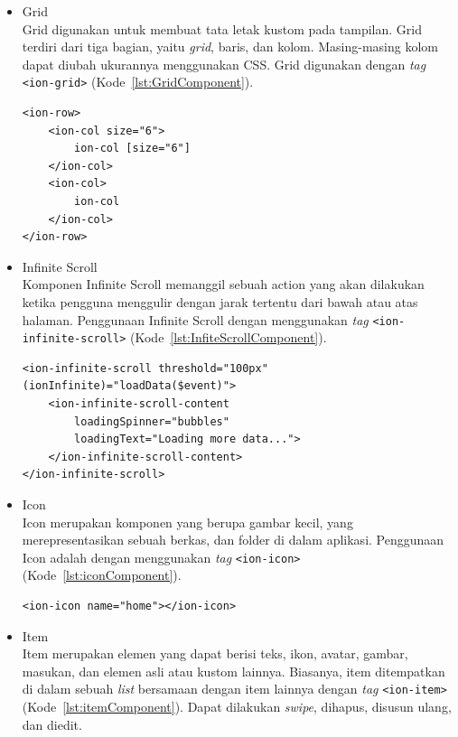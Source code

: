 \begin{itemize}
	\item Grid \\
	Grid digunakan untuk membuat tata letak kustom pada tampilan. Grid terdiri dari tiga bagian, yaitu \textit{grid}, baris, dan kolom. Masing-masing kolom dapat diubah ukurannya menggunakan CSS. Grid digunakan dengan \textit{tag} \texttt{<ion-grid>} (Kode~\ref{lst:GridComponent}).	

\begin{lstlisting}[label={lst:GridComponent}, caption=Potongan Kode Program dari Grid Component]
<ion-row>
	<ion-col size="6">
    	ion-col [size="6"]
    </ion-col>
    <ion-col>
      	ion-col
    </ion-col>
</ion-row>
\end{lstlisting}
	\newpage
	\item Infinite Scroll	\\
	Komponen Infinite Scroll memanggil sebuah action yang akan dilakukan ketika pengguna menggulir dengan jarak tertentu dari bawah atau atas halaman. Penggunaan Infinite Scroll dengan menggunakan {\it tag} \texttt{<ion-infinite-scroll>} (Kode~\ref{lst:InfiteScrollComponent}). 
	
\begin{lstlisting}[label={lst:InfiteScrollComponent}, caption=Potongan Kode Program dari Infinite Scroll Component]
<ion-infinite-scroll threshold="100px" (ionInfinite)="loadData($event)">
	<ion-infinite-scroll-content
		loadingSpinner="bubbles"
		loadingText="Loading more data...">
	</ion-infinite-scroll-content>
</ion-infinite-scroll>
\end{lstlisting}
	
	\item Icon \\
	Icon merupakan komponen yang berupa gambar kecil, yang merepresentasikan sebuah berkas, dan folder di dalam aplikasi. Penggunaan Icon adalah dengan menggunakan {\it tag} \texttt{<ion-icon>} (Kode~\ref{lst:iconComponent}).
\begin{lstlisting}[label={lst:iconComponent}, caption=Potongan Kode Program dari Icon Home]
<ion-icon name="home"></ion-icon>
\end{lstlisting} 
	\item Item \\
	Item merupakan elemen yang dapat berisi teks, ikon, avatar, gambar, masukan, dan elemen asli atau kustom lainnya. Biasanya, item ditempatkan di dalam sebuah {\it list} bersamaan dengan item lainnya dengan {\it tag} \texttt{<ion-item>} (Kode~\ref{lst:itemComponent}). Dapat dilakukan {\it swipe}, dihapus, disusun ulang, dan diedit.
	

\end{itemize}
